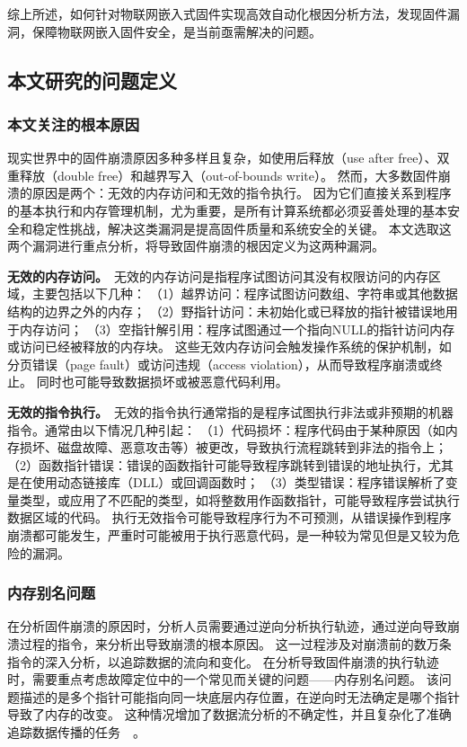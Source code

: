 综上所述，如何针对物联网嵌入式固件实现高效自动化根因分析方法，发现固件漏洞，保障物联网嵌入固件安全，是当前亟需解决的问题。

\subsection{本文研究的问题定义}             %
\subsubsection{本文关注的根本原因}          %
现实世界中的固件崩溃原因多种多样且复杂，如使用后释放（use after free）、双重释放（double free）和越界写入（out-of-bounds write）。
然而，大多数固件崩溃的原因是两个：无效的内存访问和无效的指令执行。
因为它们直接关系到程序的基本执行和内存管理机制，尤为重要，是所有计算系统都必须妥善处理的基本安全和稳定性挑战，解决这类漏洞是提高固件质量和系统安全的关键。
本文选取这两个漏洞进行重点分析，将导致固件崩溃的根因定义为这两种漏洞。

\textbf{无效的内存访问。}\ 无效的内存访问是指程序试图访问其没有权限访问的内存区域，主要包括以下几种：
（1）越界访问：程序试图访问数组、字符串或其他数据结构的边界之外的内存；
（2）野指针访问：未初始化或已释放的指针被错误地用于内存访问；
（3）空指针解引用：程序试图通过一个指向NULL的指针访问内存或访问已经被释放的内存块。
这些无效内存访问会触发操作系统的保护机制，如分页错误（page fault）或访问违规（access violation），从而导致程序崩溃或终止。
同时也可能导致数据损坏或被恶意代码利用。

\textbf{无效的指令执行。}\ 无效的指令执行通常指的是程序试图执行非法或非预期的机器指令。通常由以下情况几种引起：
（1）代码损坏：程序代码由于某种原因（如内存损坏、磁盘故障、恶意攻击等）被更改，导致执行流程跳转到非法的指令上；
（2）函数指针错误：错误的函数指针可能导致程序跳转到错误的地址执行，尤其是在使用动态链接库（DLL）或回调函数时；
（3）类型错误：程序错误解析了变量类型，或应用了不匹配的类型，如将整数用作函数指针，可能导致程序尝试执行数据区域的代码。
执行无效指令可能导致程序行为不可预测，从错误操作到程序崩溃都可能发生，严重时可能被用于执行恶意代码，是一种较为常见但是又较为危险的漏洞。

\subsubsection{内存别名问题}                %
在分析固件崩溃的原因时，分析人员需要通过逆向分析执行轨迹，通过逆向导致崩溃过程的指令，来分析出导致崩溃的根本原因。
这一过程涉及对崩溃前的数万条指令的深入分析，以追踪数据的流向和变化。
在分析导致固件崩溃的执行轨迹时，需要重点考虑故障定位中的一个常见而关键的问题——内存别名问题。
该问题描述的是多个指针可能指向同一块底层内存位置，在逆向时无法确定是哪个指针导致了内存的改变。
这种情况增加了数据流分析的不确定性，并且复杂化了准确追踪数据传播的任务~\cite{REPT}~\cite{RETracer2016}。

